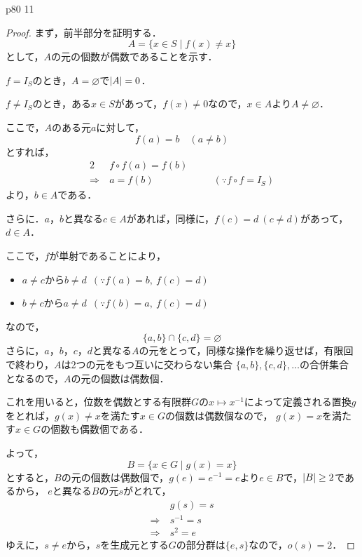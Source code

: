 \documentclass[dvipdfmx,uplatex,11pt]{jsarticle}
\DeclarePairedDelimiter\abs{\lvert}{\rvert}
\theoremstyle{mytheorem}
\begin{document}
        \newpage
        p80 11
        \begin{leftbar}
            \begin{proof}
                まず，前半部分を証明する．
                \[
                    A = \{ x \in S \mid f(x) \ne x\}
                \]
                として，$A$の元の個数が偶数であることを示す．

                $f =I_S$のとき，$A = \varnothing$で$\abs{A}=0$．

                $f \ne I_S$のとき，ある$x \in S$があって，$f(x) \ne 0$なので，$x \in A$より$A \ne \varnothing$．

                ここで，$A$のある元$a$に対して，
                \[
                    f(a)=b \quad (a \ne b)
                \]
                とすれば，
                \begin{alignat*}{2}
                    & f \circ f (a)=f(b) & & \\
                    \Longrightarrow ~ &a=f(b) & \quad & (\because f \circ f = I_S)
                \end{alignat*}
                より，$b \in A$である．

                さらに．$a$，$b$と異なる$c \in A$があれば，同様に，$f(c)=d~(c \ne d)$があって，$d \in A$．

                ここで，$f$が単射であることにより，
                \begin{itemize}
                    \item $a \ne c$から$b \ne d$~$(\because f(a)=b,~f(c)=d)$
                    \item $b \ne c$から$a \ne d$~$(\because f(b)=a,~f(c)=d)$
                \end{itemize}
                なので，
                \[
                    \{ a,b \} \cap \{ c,d\} = \varnothing
                \]
                さらに，$a$，$b$，$c$，$d$と異なる$A$の元をとって，同様な操作を繰り返せば，有限回で終わり，$A$は2つの元をもつ互いに交わらない集合
                $\{a,b\},\{c,d\},\ldots$の合併集合となるので，$A$の元の個数は偶数個．

                これを用いると，位数を偶数とする有限群$G$の$x \longmapsto x^{-1}$によって定義される置換$g$をとれば，$g(x) \ne x$を満たす$x \in G$の個数は偶数個なので，
                $g(x)=x$を満たす$x \in G$の個数も偶数個である．

                よって，
                \[
                    B = \{ x \in G \mid g(x)=x\}
                \]
                とすると，$B$の元の個数は偶数個で，$g(e)=e^{-1}=e$より$e \in B$で，$\abs{B} \ge 2$であるから，
                $e$と異なる$B$の元$s$がとれて，
                \begin{align*}
                    & g(s)=s \\
                    \Longrightarrow ~ & s^{-1}=s \\
                    \Longrightarrow ~ & s^2 =e
                \end{align*}
                ゆえに，$s \ne e$から，$s$を生成元とする$G$の部分群は$\{e,s\}$なので，$o(s)=2$．


\end{proof}
\end{leftbar}
\end{document}
